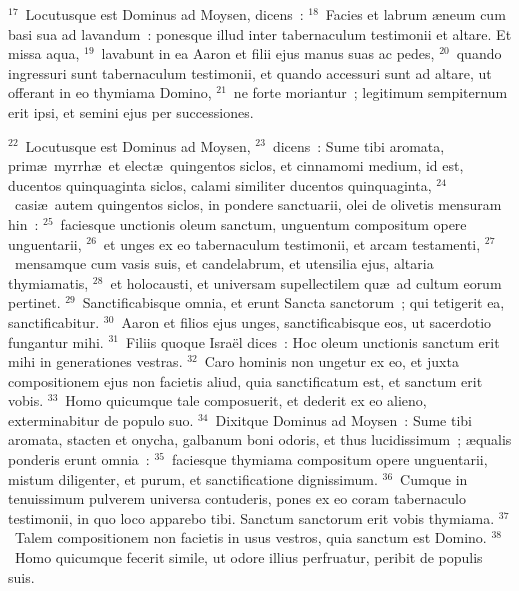 ${}^{17}$~Locutusque est Dominus ad Moysen, dicens~:
${}^{18}$~Facies et labrum \ae neum cum basi sua ad lavandum~: ponesque illud inter tabernaculum testimonii et altare. Et missa aqua,
${}^{19}$~lavabunt in ea Aaron et filii ejus manus suas ac pedes,
${}^{20}$~quando ingressuri sunt tabernaculum testimonii, et quando accessuri sunt ad altare, ut offerant in eo thymiama Domino,
${}^{21}$~ne forte moriantur~; legitimum sempiternum erit ipsi, et semini ejus per successiones.


${}^{22}$~Locutusque est Dominus ad Moysen,
${}^{23}$~dicens~: Sume tibi aromata, prim\ae\ myrrh\ae\ et elect\ae\ quingentos siclos, et cinnamomi medium, id est, ducentos quinquaginta siclos, calami similiter ducentos quinquaginta,
${}^{24}$~casi\ae\ autem quingentos siclos, in pondere sanctuarii, olei de olivetis mensuram hin~:
${}^{25}$~faciesque unctionis oleum sanctum, unguentum compositum opere unguentarii,
${}^{26}$~et unges ex eo tabernaculum testimonii, et arcam testamenti,
${}^{27}$~mensamque cum vasis suis, et candelabrum, et utensilia ejus, altaria thymiamatis,
${}^{28}$~et holocausti, et universam supellectilem qu\ae\ ad cultum eorum pertinet.
${}^{29}$~Sanctificabisque omnia, et erunt Sancta sanctorum~; qui tetigerit ea, sanctificabitur.
${}^{30}$~Aaron et filios ejus unges, sanctificabisque eos, ut sacerdotio fungantur mihi.
${}^{31}$~Filiis quoque Isra\"el dices~: Hoc oleum unctionis sanctum erit mihi in generationes vestras.
${}^{32}$~Caro hominis non ungetur ex eo, et juxta compositionem ejus non facietis aliud, quia sanctificatum est, et sanctum erit vobis.
${}^{33}$~Homo quicumque tale composuerit, et dederit ex eo alieno, exterminabitur de populo suo.
${}^{34}$~Dixitque Dominus ad Moysen~: Sume tibi aromata, stacten et onycha, galbanum boni odoris, et thus lucidissimum~; \ae qualis ponderis erunt omnia~:
${}^{35}$~faciesque thymiama compositum opere unguentarii, mistum diligenter, et purum, et sanctificatione dignissimum.
${}^{36}$~Cumque in tenuissimum pulverem universa contuderis, pones ex eo coram tabernaculo testimonii, in quo loco apparebo tibi. Sanctum sanctorum erit vobis thymiama.
${}^{37}$~Talem compositionem non facietis in usus vestros, quia sanctum est Domino.
${}^{38}$~Homo quicumque fecerit simile, ut odore illius perfruatur, peribit de populis suis.

